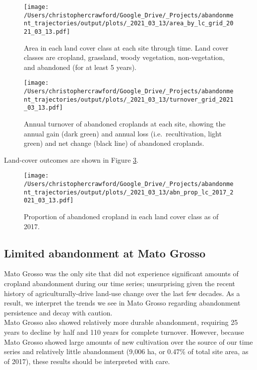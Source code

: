\documentclass[9pt,twoside,lineno]{pnas-new}
\begin{document}
\begin{figure}
\centering
\texttt{[image: /Users/christophercrawford/Google\_Drive/\_Projects/abandonment\_trajectories/output/plots/\_2021\_03\_13/area\_by\_lc\_grid\_2021\_03\_13.pdf]}
\caption{\label{fig:area-by-lc}Area in each land cover class at each site through time. Land cover classes are cropland, grassland, woody vegetation, non-vegetation, and abandoned (for at least 5 years).}
\end{figure}



\begin{figure}
\centering
\texttt{[image: /Users/christophercrawford/Google\_Drive/\_Projects/abandonment\_trajectories/output/plots/\_2021\_03\_13/turnover\_grid\_2021\_03\_13.pdf]}
\caption{\label{fig:turnover-grid}Annual turnover of abandoned croplands at each site, showing the annual gain (dark green) and annual loss (i.e.~recultivation, light green) and net change (black line) of abandoned croplands.}
\end{figure}

Land-cover outcomes are shown in Figure \ref{fig:abn-prop-lc}.



\begin{figure}
\centering
\texttt{[image: /Users/christophercrawford/Google\_Drive/\_Projects/abandonment\_trajectories/output/plots/\_2021\_03\_13/abn\_prop\_lc\_2017\_2021\_03\_13.pdf]}
\caption{\label{fig:abn-prop-lc}Proportion of abandoned cropland in each land cover class as of 2017.}
\end{figure}

\hypertarget{mato-grosso}{%
\subsection{Limited abandonment at Mato Grosso}\label{mato-grosso}}

Mato Grosso was the only site that did not experience significant amounts of cropland abandonment during our time series; unsurprising given the recent history of agriculturally-drive land-use change over the last few decades.
As a result, we interpret the trends we see in Mato Grosso regarding abandonment persistence and decay with caution.\\
Mato Grosso also showed relatively more durable abandonment, requiring 25 years to decline by half and 110 years for complete turnover.
However, because Mato Grosso showed large amounts of new cultivation over the source of our time series and relatively little abandonment (9,006 ha, or 0.47\% of total site area, as of 2017), these results should be interpreted with care.
\end{document}

